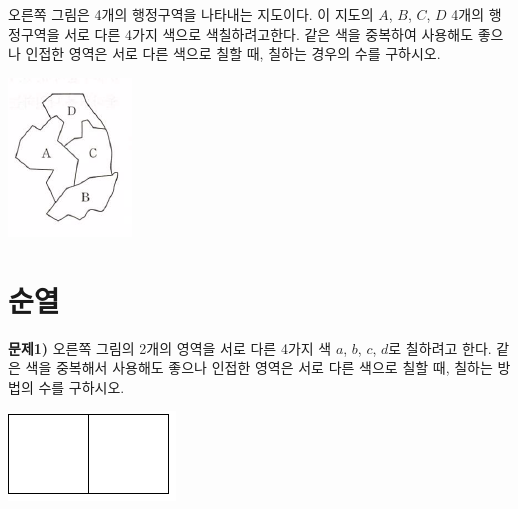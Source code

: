 \documentclass[a4paper]{oblivoir}
\begin{document}
%
\begin{minipage}{.65\textwidth}
\begin{Exercise}
오른쪽 그림은 4개의 행정구역을 나타내는 지도이다. 이 지도의 \(A\), \(B\), \(C\), \(D\) 4개의 행정구역을 서로 다른 4가지 색으로 색칠하려고한다.
같은 색을 중복하여 사용해도 좋으나 인접한 영역은 서로 다른 색으로 칠할 때, 칠하는 경우의 수를 구하시오.
\end{Exercise}
\end{minipage}
\quad
\begin{minipage}{.25\textwidth}
\includegraphics[width=.5\textwidth]{8}
\end{minipage}


\section{순열}

\bigskip\noindent
%
\begin{minipage}{.65\textwidth}
\textbf{문제1)}
오른쪽 그림의 2개의 영역을 서로 다른 4가지 색 \(a\), \(b\), \(c\), \(d\)로 칠하려고 한다.
같은 색을 중복해서 사용해도 좋으나 인접한 영역은 서로 다른 색으로 칠할 때, 칠하는 방법의 수를 구하시오.
\end{minipage}
\quad
\begin{minipage}{.25\textwidth}
\includegraphics[width=.5\textwidth]{1}
\end{minipage}
\end{document}
